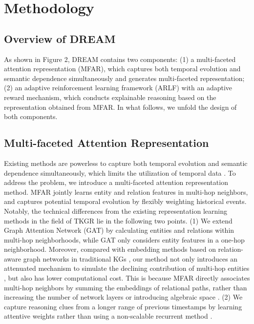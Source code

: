 \documentclass[sigconf,natbib=true]{acmart}
\begin{document}
\section{Methodology}
\subsection{Overview of DREAM}

As shown in Figure 2, DREAM contains two components: (1) a multi-faceted attention representation (MFAR), which captures both temporal evolution and semantic dependence simultaneously and generates multi-faceted representation; (2) an adaptive reinforcement learning framework (ARLF) with an adaptive  reward mechanism, which conducts explainable reasoning based on the representation obtained from MFAR. In what follows, we unfold the design of both components.


\subsection{Multi-faceted Attention Representation}
Existing methods are powerless to capture both temporal evolution and semantic dependence simultaneously, which limits the utilization of temporal data \cite{bothsurvey, TKG-survey-bai}. To address the problem, we introduce a multi-faceted attention representation method. MFAR jointly learns entity and relation features in multi-hop neighbors, and captures potential temporal evolution by flexibly weighting historical events. Notably, the technical differences from the existing representation learning methods in the field of TKGR lie in the following two points. (1) We extend Graph Attention Network (GAT) by calculating entities and relations within multi-hop neighborhoods, while GAT only considers entity features in a one-hop neighborhood. Moreover, compared with embedding methods based on relation-aware graph networks in traditional 
 KGs \cite{RGHAT, M2GNN}, our method not only introduces an attenuated mechanism to simulate the declining contribution of multi-hop entities \cite{THML}, but also has lower computational cost. This is because MFAR directly associates multi-hop neighbors by summing the embeddings of relational paths, rather than increasing the number of network layers or introducing algebraic space  \cite{cost}. (2) We capture reasoning clues from a longer range of previous timestamps  by learning attentive weights rather than using a non-scalable recurrent method \cite{attention}. 

\end{document}
